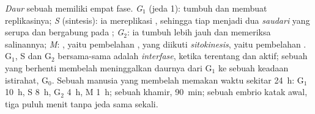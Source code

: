 \begin{definition}\label{def:b1:replication-mitosis:cycle}
\emph{Daur } sebuah  memiliki empat fase.
\emph{G$_1$} (jeda 1):  tumbuh dan membuat  replikasinya;
\emph{S} (sintesis): ia mereplikasi , sehingga tiap 
menjadi dua \emph{ saudari} yang serupa dan bergabung pada
; \emph{G$_2$}: ia tumbuh lebih jauh dan memeriksa
salinannya; \emph{M}: \emph{}, yaitu pembelahan , yang
diikuti \emph{sitokinesis}, yaitu pembelahan . G$_1$, S dan
G$_2$ bersama-sama adalah \emph{interfase}, ketika 
terentang dan aktif; sebuah  yang berhenti membelah meninggalkan
daurnya dari G$_1$ ke sebuah keadaan istirahat, G$_0$. Sebuah 
manusia yang membelah memakan waktu sekitar
\qty{24}{h}: G$_1$ \qty{10}{h}, S \qty{8}{h}, G$_2$ \qty{4}{h}, M
\qty{1}{h}; sebuah khamir, \qty{90}{min}; sebuah embrio katak awal, tiga
puluh menit tanpa jeda sama sekali.
\end{definition}

